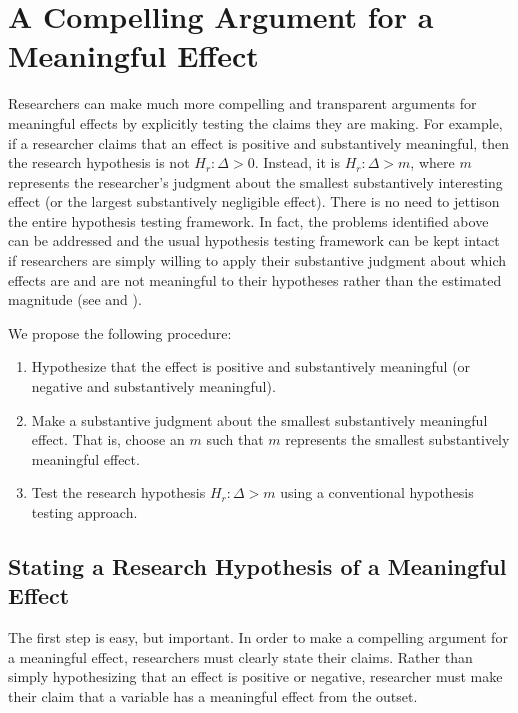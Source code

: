 \documentclass[12pt]{article}
\begin{document}
\section*{A Compelling Argument for a Meaningful Effect}

Researchers can make much more compelling and transparent arguments for meaningful effects by explicitly testing the claims they are making. For example, if  a researcher claims that an effect is positive and substantively meaningful, then the research hypothesis is not $H_r: \Delta > 0$. Instead, it is $H_r: \Delta > m$, where $m$ represents the researcher's judgment about the smallest substantively interesting effect (or the largest substantively negligible effect). There is no need to jettison the entire hypothesis testing framework. In fact, the problems identified above can be addressed and the usual hypothesis testing framework can be kept intact if researchers are simply willing to apply their substantive judgment about which effects are and are not meaningful to their hypotheses rather than the estimated magnitude (see \citealt{Rainey2014} and \citealt{Gross2014}). 

We propose the following procedure:

\begin{enumerate}
\item Hypothesize that the effect is positive and substantively meaningful (or negative and substantively meaningful).
\item Make a substantive judgment about the smallest substantively meaningful effect. That is, choose an $m$ such that $m$ represents the smallest substantively meaningful effect.
\item Test the research hypothesis $H_r: \Delta > m$ using a conventional hypothesis testing approach.
\end{enumerate}

\subsection*{Stating a Research Hypothesis of a Meaningful Effect}

The first step is easy, but important. In order to make a compelling argument for a meaningful effect, researchers must clearly state their claims. Rather than simply hypothesizing that an effect is positive or negative, researcher must make their claim that a variable has a meaningful effect from the outset. 
\end{document}
